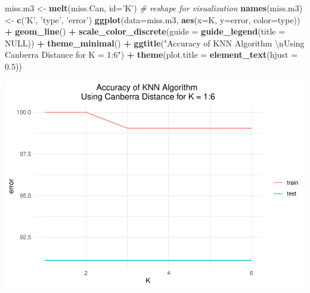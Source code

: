 \documentclass[
]{article}
\newenvironment{Shaded}{\begin{snugshade}}{\end{snugshade}}
\newcommand{\CharTok}[1]{\textcolor[rgb]{0.31,0.60,0.02}{#1}}
\newcommand{\CommentTok}[1]{\textcolor[rgb]{0.56,0.35,0.01}{\textit{#1}}}
\newcommand{\DataTypeTok}[1]{\textcolor[rgb]{0.13,0.29,0.53}{#1}}
\newcommand{\FloatTok}[1]{\textcolor[rgb]{0.00,0.00,0.81}{#1}}
\newcommand{\KeywordTok}[1]{\textcolor[rgb]{0.13,0.29,0.53}{\textbf{#1}}}
\newcommand{\NormalTok}[1]{#1}
\newcommand{\OperatorTok}[1]{\textcolor[rgb]{0.81,0.36,0.00}{\textbf{#1}}}
\newcommand{\OtherTok}[1]{\textcolor[rgb]{0.56,0.35,0.01}{#1}}
\newcommand{\StringTok}[1]{\textcolor[rgb]{0.31,0.60,0.02}{#1}}
\begin{document}
\begin{Shaded}
\begin{Highlighting}[]
\NormalTok{miss.m3 <-}\StringTok{ }\KeywordTok{melt}\NormalTok{(miss.Can, }\DataTypeTok{id=}\StringTok{'K'}\NormalTok{) }\CommentTok{# reshape for visualization}
\KeywordTok{names}\NormalTok{(miss.m3) <-}\StringTok{ }\KeywordTok{c}\NormalTok{(}\StringTok{'K'}\NormalTok{, }\StringTok{'type'}\NormalTok{, }\StringTok{'error'}\NormalTok{)}
\KeywordTok{ggplot}\NormalTok{(}\DataTypeTok{data=}\NormalTok{miss.m3, }\KeywordTok{aes}\NormalTok{(}\DataTypeTok{x=}\NormalTok{K, }\DataTypeTok{y=}\NormalTok{error, }\DataTypeTok{color=}\NormalTok{type)) }\OperatorTok{+}\StringTok{ }\KeywordTok{geom_line}\NormalTok{() }\OperatorTok{+}
\StringTok{       }\KeywordTok{scale_color_discrete}\NormalTok{(}\DataTypeTok{guide =} \KeywordTok{guide_legend}\NormalTok{(}\DataTypeTok{title =} \OtherTok{NULL}\NormalTok{)) }\OperatorTok{+}\StringTok{ }\KeywordTok{theme_minimal}\NormalTok{() }\OperatorTok{+}
\StringTok{       }\KeywordTok{ggtitle}\NormalTok{(}\StringTok{"Accuracy of KNN Algorithm }\CharTok{\textbackslash{}n}\StringTok{Using Canberra Distance for K = 1:6"}\NormalTok{) }\OperatorTok{+}\StringTok{ }\KeywordTok{theme}\NormalTok{(}\DataTypeTok{plot.title =} \KeywordTok{element_text}\NormalTok{(}\DataTypeTok{hjust =} \FloatTok{0.5}\NormalTok{))}
\end{Highlighting}
\end{Shaded}

\includegraphics{assessment-1_files/figure-latex/unnamed-chunk-8-3.pdf}
\end{document}

